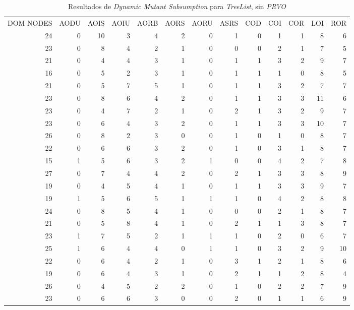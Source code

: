 \begin{table}[]
	\caption[\emph{Dynamic Mutant Subsumption} \emph{TreeList}, sin \emph{PRVO}]{Resultados de \emph{Dynamic Mutant Subsumption} para \emph{TreeList}, sin \emph{PRVO}}
	\label{tables.results.subsumption.treelist.noprvo}
	\centering
	\scriptsize
	\def\arraystretch{0.95}
	\setlength\tabcolsep{0.5mm}
	\begin{tabular}{rrrrrrrrrrrrr}
		DOM NODES & AODU & AOIS & AOIU & AORB & AORS & AORU & ASRS & COD & COI & COR & LOI & ROR \\
		24 & 0 & 10 & 3 & 4 & 2 & 0 & 1 & 0 & 1 & 1 & 8 & 6 \\
		23 & 0 & 8 & 4 & 2 & 1 & 0 & 0 & 0 & 2 & 1 & 7 & 5 \\
		21 & 0 & 4 & 4 & 3 & 1 & 0 & 1 & 1 & 3 & 2 & 9 & 7 \\
		16 & 0 & 5 & 2 & 3 & 1 & 0 & 1 & 1 & 1 & 0 & 8 & 5 \\
		21 & 0 & 5 & 7 & 5 & 1 & 0 & 1 & 1 & 3 & 2 & 7 & 7 \\
		23 & 0 & 8 & 6 & 4 & 2 & 0 & 1 & 1 & 3 & 3 & 11 & 6 \\
		23 & 0 & 4 & 7 & 2 & 1 & 0 & 2 & 1 & 3 & 2 & 9 & 7 \\
		23 & 0 & 6 & 4 & 3 & 2 & 0 & 1 & 1 & 3 & 3 & 10 & 7 \\
		26 & 0 & 8 & 2 & 3 & 0 & 0 & 1 & 0 & 1 & 0 & 8 & 7 \\
		22 & 0 & 6 & 6 & 3 & 2 & 0 & 1 & 0 & 3 & 1 & 8 & 7 \\
		15 & 1 & 5 & 6 & 3 & 2 & 1 & 0 & 0 & 4 & 2 & 7 & 8 \\
		27 & 0 & 7 & 4 & 4 & 2 & 0 & 2 & 1 & 3 & 3 & 8 & 9 \\
		19 & 0 & 4 & 5 & 4 & 1 & 0 & 1 & 1 & 3 & 3 & 9 & 7 \\
		19 & 1 & 5 & 6 & 5 & 1 & 1 & 1 & 0 & 4 & 2 & 8 & 8 \\
		24 & 0 & 8 & 5 & 4 & 1 & 0 & 0 & 0 & 2 & 1 & 8 & 7 \\
		21 & 0 & 5 & 8 & 4 & 1 & 0 & 2 & 1 & 1 & 3 & 8 & 7 \\
		23 & 1 & 7 & 5 & 2 & 1 & 1 & 1 & 0 & 2 & 0 & 6 & 7 \\
		25 & 1 & 6 & 4 & 4 & 0 & 1 & 1 & 0 & 3 & 2 & 9 & 10 \\
		22 & 0 & 6 & 4 & 2 & 1 & 0 & 3 & 1 & 2 & 1 & 8 & 6 \\
		19 & 0 & 6 & 4 & 3 & 1 & 0 & 2 & 1 & 1 & 2 & 8 & 4 \\
		26 & 0 & 4 & 5 & 2 & 2 & 0 & 1 & 0 & 2 & 2 & 7 & 9 \\
		23 & 0 & 6 & 6 & 3 & 0 & 0 & 2 & 0 & 1 & 1 & 6 & 9 \\

\end{tabular}
\end{table}
